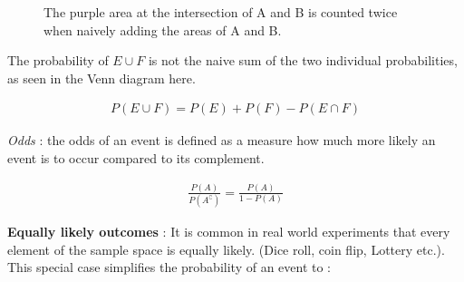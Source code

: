 \begin{figure}[H]
	\centering
	\caption{The purple area at the intersection of A and B is counted twice when naively adding the areas of A and B.} 
\end{figure} 

The probability of $ E \cup F $ is not the naive sum of the two individual probabilities, as seen in the Venn diagram here.

\begin{align}
	P(E \cup F) = P(E) + P(F) - P(E \cap F)
\end{align}

\textit{Odds} : the odds of an event is defined as a measure how much more likely an event is to occur compared to its complement. 

\begin{align}
	\frac{P(A)}{P(A^\complement)} = \frac{P(A)}{1 - P(A)}
\end{align}

\textbf{Equally likely outcomes} : It is common in real world experiments that every element of the sample space is equally likely. (Dice roll, coin flip, Lottery etc.). This special case simplifies the probability of an event to : 

